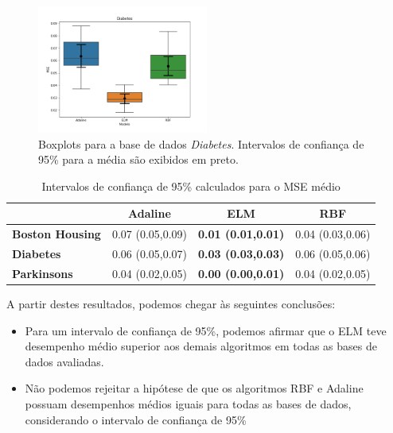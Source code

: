 \documentclass[conference]{IEEEtran}
\begin{document}
	\begin{figure}[thpbh]
		\centering
		\includegraphics[width=0.5\textwidth]{figures/Diabetes_scores.png}
		\caption{Boxplots para a base de dados \textit{Diabetes}. Intervalos de confiança de 95\% para a média são exibidos em preto.}
		\label{fig:box-Diabetes}
	\end{figure}

	
	\begin{table}[thpbh]
		\caption{Intervalos de confiança de 95\% calculados para o MSE médio}
		\label{tab:regression}
		\centering
			\begin{tabular}{l|c|c|c|}
				\cline{2-4}
				& \textbf{Adaline} & \textbf{ELM}              & \textbf{RBF}     \\ \hline
				\multicolumn{1}{|l|}{\textbf{Boston Housing}} & 0.07 (0.05,0.09) & \textbf{0.01 (0.01,0.01)} & 0.04 (0.03,0.06) \\ \hline
				\multicolumn{1}{|l|}{\textbf{Diabetes}}       & 0.06 (0.05,0.07) & \textbf{0.03 (0.03,0.03)} & 0.06 (0.05,0.06) \\ \hline
				\multicolumn{1}{|l|}{\textbf{Parkinsons}}     & 0.04 (0.02,0.05) & \textbf{0.00 (0.00,0.01)} & 0.04 (0.02,0.05) \\ \hline
			\end{tabular}
	\end{table}

	A partir destes resultados, podemos chegar às seguintes conclusões:
	\begin{itemize}
		\item Para um intervalo de confiança de 95\%, podemos afirmar que o ELM teve desempenho médio superior aos demais algoritmos em todas as bases de dados avaliadas.
		\item Não podemos rejeitar a hipótese de que os algoritmos RBF e Adaline possuam desempenhos médios iguais para todas as bases de dados, considerando o intervalo de confiança de 95\%
	\end{itemize}
	
\end{document}
